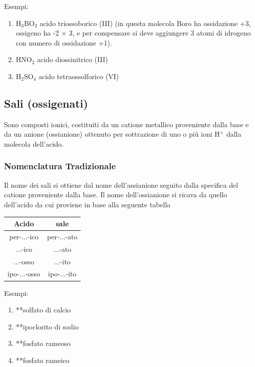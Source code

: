 \documentclass[a4paper]{article}
\begin{document}
Esempi:
\begin{enumerate}
    \item H$_3$BO$_3$ acido triossoborico (III) (in questa molecola Boro ha ossidazione +3, ossigeno ha -2 $\times$ 3, e per compensare si deve aggiungere 3 atomi di idrogeno con numero di ossidazione +1).
    \item HNO$_2$ acido diossinitrico (III)
    \item H$_2$SO$_4$ acido tetraossolforico (VI)
\end{enumerate}

\subsection{Sali (ossigenati)}
Sono composti ionici, costituiti da un catione metallico proveniente dalla base e da un anione (ossianione) ottenuto per sottrazione di uno o più ioni H$^+$ dalla molecola dell'acido. 

\subsubsection{Nomenclatura Tradizionale}
Il nome dei sali si ottiene dal nome dell'assianione seguito dalla specifica del catione proveniente dalla base. Il nome dell'ossianione si ricava da quello dell'acido da cui proviene in base alla seguente tabella
\begin{table}[!h]
    \centering
    \begin{tabular}{|c|c|}
        \hline
        Acido & sale\\
        \hline
        per-...-ico & per-...-ato\\
        \hline
        ...-ico & ...-ato\\
        \hline
        ...-osso & ...-ito\\
        \hline
        ipo-...-osso & ipo-...-ito\\
        \hline
    \end{tabular}
\end{table}
\FloatBarrier
Esempi:
\begin{enumerate}
    \item {} **solfato di calcio
    \item {} **ipoclorito di sodio
    \item {} **fosfato rameoso
    \item {} **fosfato rameico
\end{enumerate}
\end{document}
